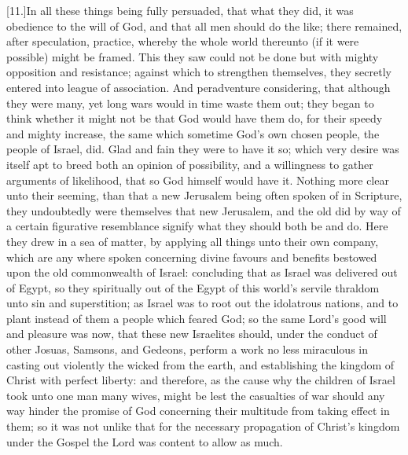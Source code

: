 [11.]In all these things being fully persuaded, that what they did, it was obedience to the will of God, and that all men should do the like; there remained, after speculation, practice, whereby the whole world thereunto (if it were possible) might be framed. This they saw could not be done but with mighty opposition and resistance; against which to strengthen themselves, they secretly entered into league of association. And peradventure considering, that although they were many, yet long wars would in time waste them out; they began to think whether it might not be that God would have them do, for their speedy and mighty increase, the same which sometime God’s own chosen people, the people of Israel, did. Glad and fain they were to have it so; which very desire was itself apt to breed both an opinion of possibility, and a willingness to gather arguments of likelihood, that so God himself would have it. Nothing more clear unto their seeming, than that a new Jerusalem being often spoken of in Scripture, they undoubtedly were themselves that new Jerusalem, and the old did by way of a certain figurative resemblance signify what they should both be and do. Here they drew in a sea of matter, by applying all things unto their own company, which are any where spoken concerning divine favours and benefits bestowed upon the old commonwealth of Israel: concluding that as Israel was delivered out of Egypt, so they spiritually out of the Egypt of this world’s servile thraldom unto sin and superstition; as Israel was to root out the idolatrous nations, and to plant instead of them a people which feared God; so the same Lord’s good will and pleasure was now, that these new Israelites should, under the conduct of other Josuas, Samsons, and Gedeons, perform a work no less miraculous in casting out violently the wicked from the earth, and establishing the kingdom of Christ with perfect liberty: and therefore, as the cause why the children of Israel took unto one man many wives, might be lest the casualties of war should any way hinder the promise of God concerning their multitude from taking effect in them; so it was not unlike that for the necessary propagation of Christ’s kingdom under the Gospel the Lord was content to allow as much.

